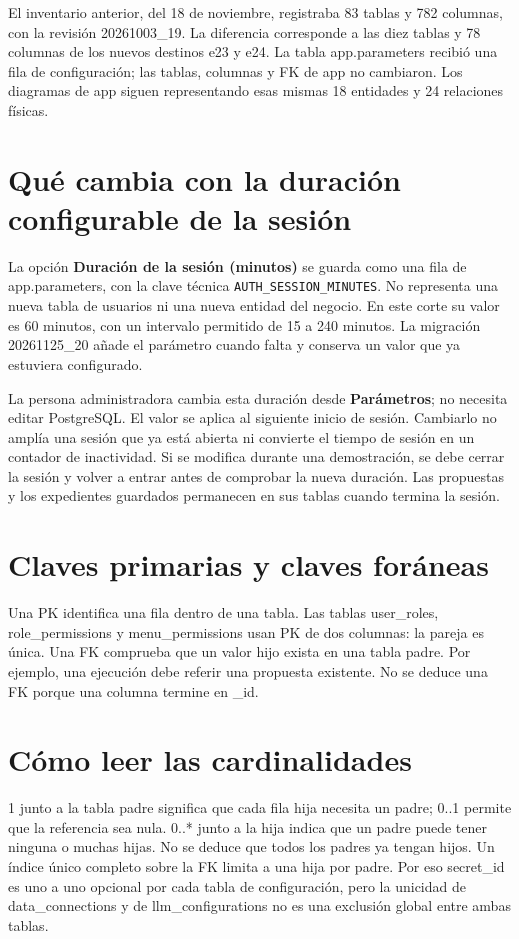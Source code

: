 El inventario anterior, del 18 de noviembre, registraba 83 tablas y 782 columnas, con la revisión 20261003\_\allowbreak{}19. La diferencia corresponde a las diez tablas y 78 columnas de los nuevos destinos e23 y e24. La tabla app.parameters recibió una fila de configuración; las tablas, columnas y FK de app no cambiaron. Los diagramas de app siguen representando esas mismas 18 entidades y 24 relaciones físicas.

\section{Qué cambia con la duración configurable de la sesión}
La opción \textbf{Duración de la sesión (minutos)} se guarda como una fila de app.parameters, con la clave técnica \texttt{AUTH\_SESSION\_MINUTES}. No representa una nueva tabla de usuarios ni una nueva entidad del negocio. En este corte su valor es 60 minutos, con un intervalo permitido de 15 a 240 minutos. La migración 20261125\_\allowbreak{}20 añade el parámetro cuando falta y conserva un valor que ya estuviera configurado.

La persona administradora cambia esta duración desde \textbf{Parámetros}; no necesita editar PostgreSQL. El valor se aplica al siguiente inicio de sesión. Cambiarlo no amplía una sesión que ya está abierta ni convierte el tiempo de sesión en un contador de inactividad. Si se modifica durante una demostración, se debe cerrar la sesión y volver a entrar antes de comprobar la nueva duración. Las propuestas y los expedientes guardados permanecen en sus tablas cuando termina la sesión.

\section{Claves primarias y claves foráneas}
Una PK identifica una fila dentro de una tabla. Las tablas user\_\allowbreak{}roles, role\_\allowbreak{}permissions y menu\_\allowbreak{}permissions usan PK de dos columnas: la pareja es única. Una FK comprueba que un valor hijo exista en una tabla padre. Por ejemplo, una ejecución debe referir una propuesta existente. No se deduce una FK porque una columna termine en \_\allowbreak{}id.

\section{Cómo leer las cardinalidades}
1 junto a la tabla padre significa que cada fila hija necesita un padre; 0..1 permite que la referencia sea nula. 0..* junto a la hija indica que un padre puede tener ninguna o muchas hijas. No se deduce que todos los padres ya tengan hijos. Un índice único completo sobre la FK limita a una hija por padre. Por eso secret\_\allowbreak{}id es uno a uno opcional por cada tabla de configuración, pero la unicidad de data\_\allowbreak{}connections y de llm\_\allowbreak{}configurations no es una exclusión global entre ambas tablas.

